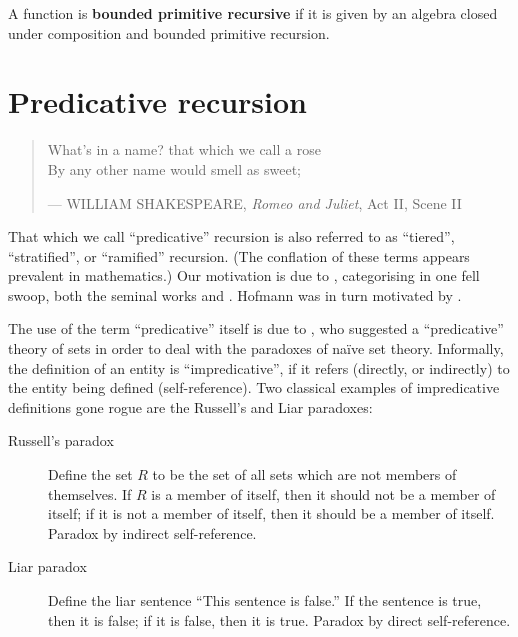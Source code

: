 \begin{definition} A function is \textbf{bounded primitive recursive} if it is
given by an algebra closed under composition and bounded primitive recursion.
\end{definition}

\section{Predicative recursion}

\begin{quotation}

\footnotesize\sffamily\itshape

\begin{flushright}

What's in a name? that which we call a rose \\
By any other name would smell as sweet;

\smallbreak

\upshape

--- WILLIAM SHAKESPEARE, \emph{Romeo and Juliet}, Act II, Scene II

\end{flushright}

\end{quotation}

That which we call ``predicative'' recursion is also referred to as
``tiered''\cite{leivant-1990}, ``stratified''\cite{leivant-1993}, or
``ramified''\cite{leivant-1995} recursion. (The conflation of these terms
appears prevalent in mathematics.) Our motivation is due to
\cite{hofmann-2000a}, categorising in one fell swoop, both the seminal works
\cite{bellantoni-cook-1992} and \cite{leivant-1995}. Hofmann was in turn
motivated by \cite{bellantoni-phd-1992}.

The use of the term ``predicative'' itself is due to \cite{russell-1907}, who
suggested a ``predicative'' theory of sets in order to deal with the paradoxes
of na\"ive set theory. Informally, the definition of an entity is
``impredicative''\cite{goedel-1944}, if it refers (directly, or indirectly) to
the entity being defined (self-reference). Two classical examples of
impredicative definitions gone rogue are the Russell's and Liar paradoxes: 

\begin{description}

\item [Russell's paradox] Define the set $R$ to be the set of all sets which
are not members of themselves. If $R$ is a member of itself, then it should not
be a member of itself; if it is not a member of itself, then it should be a
member of itself. Paradox by indirect self-reference.

\item [Liar paradox] Define the liar sentence ``This sentence is false.'' If
the sentence is true, then it is false; if it is false, then it is true.
Paradox by direct self-reference.

\end{description} 

